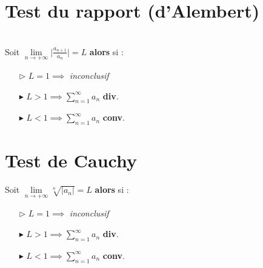\documentclass{report}
\begin{document}
\begin{multicols*}{3}
    \section{Test du rapport (d'Alembert)}
    \mbox{}\vspace{0.2em}\\
    Soit $\lim\limits_{n \to+\infty } \Big|\frac{a_{n+1}}{a_n}  \Big| = L$ 
    \textbf{alors} si :   
    \begin{itemize}
    \item [$\rhd$ ] $L = 1 \implies$ \textit{ inconclusif}  
    \item [$\blacktriangleright$ ] $L > 1 \implies \sum_{n=1}^{\infty } a_n$ 
      \textbf{div}.   
    \item [$\blacktriangleright$ ] $L < 1 \implies \sum_{n=1}^{\infty } a_n$ \textbf{conv}.   
    \end{itemize}


    \section{Test de Cauchy}
    \mbox{}\vspace{0.2em}
    Soit $\lim\limits_{n \to+\infty } \sqrt[n]{\big| a_n \big|} = L$ 
    \textbf{alors} si :   
    \begin{itemize}
    \item [$\rhd$ ] $L = 1 \implies$ \textit{inconclusif}  
    \item [$\blacktriangleright$ ] $L > 1 \implies \sum_{n=1}^{\infty }a_n$ 
      \textbf{div}.   
    \item [$\blacktriangleright$ ] $L < 1 \implies \sum_{n=1}^{\infty }a_n$ 
      \textbf{conv}.
    \end{itemize}


                                                



     





    

       








        





  






\end{multicols*}
\end{document}
